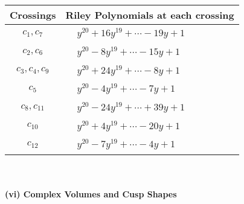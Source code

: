 \documentclass[1p]{elsarticle_modified}
\theoremstyle{definition}
\begin{document}
\begin{tabular}{m{50pt}|m{274pt}}
Crossings & \hspace{64pt}Riley Polynomials at each crossing \\
\hline $$\begin{aligned}c_{1},c_{7}\end{aligned}$$&$\begin{aligned}
&y^{20}+16 y^{19}+\cdots-19 y+1
\end{aligned}$\\
\hline $$\begin{aligned}c_{2},c_{6}\end{aligned}$$&$\begin{aligned}
&y^{20}-8 y^{19}+\cdots-15 y+1
\end{aligned}$\\
\hline $$\begin{aligned}c_{3},c_{4},c_{9}\end{aligned}$$&$\begin{aligned}
&y^{20}+24 y^{19}+\cdots-8 y+1
\end{aligned}$\\
\hline $$\begin{aligned}c_{5}\end{aligned}$$&$\begin{aligned}
&y^{20}-4 y^{19}+\cdots-7 y+1
\end{aligned}$\\
\hline $$\begin{aligned}c_{8},c_{11}\end{aligned}$$&$\begin{aligned}
&y^{20}-24 y^{19}+\cdots+39 y+1
\end{aligned}$\\
\hline $$\begin{aligned}c_{10}\end{aligned}$$&$\begin{aligned}
&y^{20}+4 y^{19}+\cdots-20 y+1
\end{aligned}$\\
\hline $$\begin{aligned}c_{12}\end{aligned}$$&$\begin{aligned}
&y^{20}-7 y^{19}+\cdots-4 y+1
\end{aligned}$\\
\hline
\end{tabular}\\~\\
\newpage\flushleft \textbf{(vi) Complex Volumes and Cusp Shapes}
\end{document}
